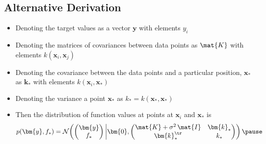 \begin{slide}
\section[-2]{Alternative Derivation}

\begin{PauseHighLight}
  \begin{itemize}
  \item Denoting the target values as a vector $\bm{y}$ with elements
    $y_i$\pause
  \item Denoting the matrices of covariances between data points as
    $\mat{K}$ with elements $k(\bm{x}_i,\bm{x}_j)$\pause
  \item Denoting the covariance between the data points and a
    particular position, $\bm{x}_*$ as $\bm{k}_*$ with elements
    $k(\bm{x}_i, \bm{x}_*)$\pause
  \item Denoting the variance a point $\bm{x}_*$ as $k_*=k(\bm{x}_*,
    \bm{x}_*)$\pause
  \item Then the distribution of function values at points at $\bm{x}_i$
    and $\bm{x}_*$ is
    \begin{align*}
      p(\bm{y}, f_*) = \mathcal{N}\!\left(
      \begin{pmatrix}
        \bm{y}  \\ f_*
      \end{pmatrix}
      \bigg \vert \bm{0} ,
      \begin{pmatrix}
        \mat{K} + \sigma^2 \, \mat{I} & \bm{k}_* \\
        \bm{k}_*^\tr & k_*
      \end{pmatrix}\right)\pause
    \end{align*}
  \end{itemize}
\end{PauseHighLight}
\end{slide}


